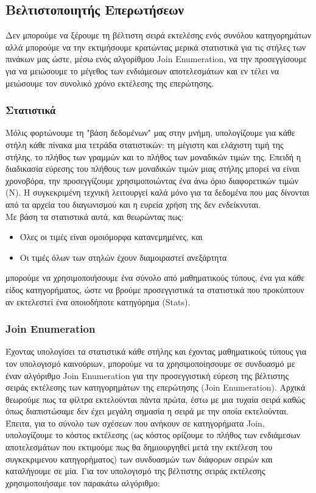 \documentclass[12pt, a4paper]{article}
\begin{document}
\subsection{Βελτιστοποιητής Επερωτήσεων}

Δεν μπορούμε να ξέρουμε τη βέλτιστη σειρά εκτελέσης ενός συνόλου κατηγορημάτων αλλά μπορούμε να την εκτιμήσουμε κρατώντας μερικά στατιστικά για τις στήλες των πινάκων μας ώστε, μέσω ενός αλγορίθμου Join Enumeration, να την προσεγγίσουμε για να μειώσουμε το μέγεθος των ενδιάμεσων αποτελεσμάτων και εν τέλει να μειώσουμε τον συνολικό χρόνο εκτέλεσης της επερώτησης. 

\subsubsection{Στατιστικά}

Μόλις φορτώνουμε τη "βάση δεδομένων" μας στην μνήμη, υπολογίζουμε για κάθε στήλη κάθε πίνακα μια τετράδα στατιστικών: τη μέγιστη και ελάχιστη τιμή της στήλης, το πλήθος των γραμμών και το πλήθος των μοναδικών τιμών της. Επειδή η διαδικασία εύρεσης του πλήθους των μοναδικών τιμών μιας στήλης μπορεί να είναι χρονοβόρα, την προσεγγίζουμε χρησιμοποιώντας ένα άνω όριο διαφορετικών τιμών (Ν). Η συγκεκριμένη τεχνική λειτουργεί καλά μόνο για τα δεδομένα που μας δίνονται από τα αρχεία του διαγωνισμού και η ευρεία χρήση της δεν ενδείκνυται.\\

Με βάση τα στατιστικά αυτά, και θεωρώντας πως:

\begin{itemize}
	\item Όλες οι τιμές είναι ομοιόμορφα κατανεμημένες, και
	\item Οι τιμές όλων των στηλών έχουν διαμοιραστεί ανεξάρτητα
\end{itemize}

μπορούμε να χρησιμοποιήσουμε ένα σύνολο από μαθηματικούς τύπους, ένα για κάθε είδος κατηγορήματος, ώστε να βρούμε προσεγγιστικά τα στατιστικά που προκύπτουν αν εκτελεστεί ένα οποιοδήποτε κατηγόρημα (Stats).

\subsubsection{Join Enumeration}

Έχοντας υπολογίσει τα στατιστικά κάθε στήλης και έχοντας μαθηματικούς τύπους για τον υπολογισμό καινούριων, μπορούμε να τα χρησιμοποίησουμε σε συνδυασμό με έναν αλγόριθμο Join Enumeration για την προσεγγιστική εύρεση της βέλτιστης σειράς εκτέλεσης των κατηγορημάτων της επερώτησης (Join Enumeration). Αρχικά θεωρούμε πως τα φίλτρα εκτελούνται πάντα πρώτα, έστω με μια τυχαία σειρά καθώς όπως διαπιστώσαμε δεν έχει μεγάλη σημασία η σειρά με την οποία εκτελούνται. Έπειτα, για το σύνολο των σχέσεων που ανήκουν σε κατηγορήματα Join, υπολογίζουμε το κόστος εκτέλεσης (ως κόστος ορίζουμε το πλήθος των ενδιάμεσων αποτελεσμάτων που εκτιμούμε πως θα δημιουργηθεί μετά την εκτέλεση του συγκεκριμενου κατηγορήματος) των συνδυασμών των διάφορων σειρών και καταλήγουμε σε μία. Για τον υπολογισμό της βέλτιστης σειράς εκτέλεσης χρησιμοποιήσαμε τον παρακάτω αλγόριθμο:
\end{document}

